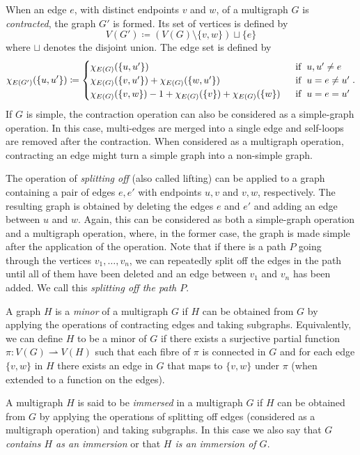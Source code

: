 \documentclass[11pt]{article}
\begin{document}
\par 
When an edge $e$, with distinct endpoints $v$ and $w$, of a multigraph $G$ is \emph{contracted}, the graph $G'$ is formed. Its set of vertices is defined by 
$$V(G') \coloneqq (V(G)\setminus \{v,w\}) \sqcup \{e\}$$
where $\sqcup$ denotes the disjoint union. The edge set is defined by \begin{align*}
    \chi_{E(G')}(\{u,u'\}) \coloneqq \begin{cases}
        \chi_{E(G)}(\{u, u'\}) &\hspace{6pt}\text{if}\hspace{6pt} u,u' \neq e \\
        \chi_{E(G)}(\{v, u'\}) + \chi_{E(G)}(\{w, u'\}) &\hspace{6pt}\text{if}\hspace{6pt} u = e \neq u'\\
        \chi_{E(G)}(\{v,w\}) -1 + \chi_{E(G)}(\{v\}) + \chi_{E(G)}(\{w\}) &\hspace{6pt}\text{if}\hspace{6pt} u = e = u'
    \end{cases}.
\end{align*}
If $G$ is simple, the contraction operation can also be considered as a simple-graph operation. In this case, multi-edges are merged into a single edge and self-loops are removed after the contraction.
When considered as a multigraph operation, contracting an edge might turn a simple graph into a non-simple graph.
\par 
The operation of \emph{splitting off} (also called lifting) can be applied to a graph containing a pair of edges $e,e'$ with endpoints $u,v$ and $v,w$, respectively. The resulting graph is obtained by deleting the edges $e$ and $e'$ and adding an edge between $u$ and $w$. Again, this can be considered as both a simple-graph operation and a multigraph operation, where, in the former case, the graph is made simple after the application of the operation. Note that if there is a path $P$ going through the vertices $v_1,\ldots, v_n$, we can repeatedly split off the edges in the path until all of them have been deleted and an edge between $v_1$ and $v_{n}$ has been added. We call this \emph{splitting off the path $P$}.
\par
A graph $H$ is a \emph{minor} of a multigraph $G$ if $H$ can be obtained from $G$ by applying the operations of contracting edges and taking subgraphs.
Equivalently, we can define $H$ to be a minor of $G$ if there exists a surjective partial function $\pi:V(G) \rightharpoonup V(H)$ such that each fibre of $\pi$ is connected in $G$ and for each edge $\{v,w\}$ in $H$ there exists an edge in $G$ that maps to $\{v,w\}$ under $\pi$ (when extended to a function on the edges).
\par 
\begin{definition}
\label{def:immersions}
    A multigraph $H$ is said to be \emph{immersed} in a multigraph $G$ if $H$ can be obtained from $G$ by applying the operations of splitting off edges (considered as a multigraph operation) and taking subgraphs. In this case we also say that $G$ \emph{contains $H$ as an immersion} or that \emph{$H$ is an immersion of $G$}.
\end{definition}
\end{document}
